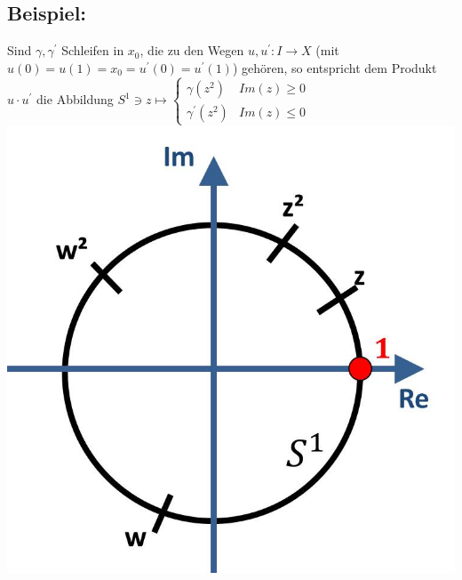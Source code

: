 \documentclass[a4paper,11pt,notitlepage]{report}
\theoremstyle{remark}
\theoremstyle{definition}
\newenvironment{bsp}[1]
{
\setlength{\fboxsep}{10pt}
\subsection*{Beispiel: #1}
\begin{upshape}
}
{
\end{upshape}
}
\begin{document}
\begin{bsp}{}
	Sind $\gamma, \gamma^\prime$ Schleifen in $x_0$, die zu den Wegen $u,u^\prime \colon I \rightarrow X$ (mit $u(0)=u(1)=x_0=u^\prime(0)=u^\prime(1)$) gehören, so entspricht dem Produkt $u \cdot u^\prime$ die Abbildung $S^1 \ni z \mapsto \begin{cases} \gamma(z^2) & Im(z) \geq 0 \\ \gamma^\prime(z^2) & Im(z) \leq 0 \end{cases}$ \newline
	\newline \includegraphics[scale=0.4]{images/Produkt_auf_S1.jpg}
\end{bsp}
\end{document}
